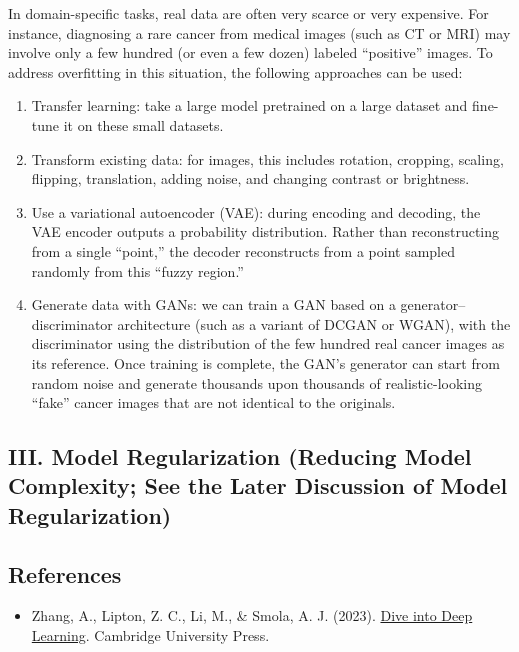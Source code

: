 In domain-specific tasks, real data are often very scarce or very expensive. For instance, diagnosing a rare cancer from medical images (such as CT or MRI) may involve only a few hundred (or even a few dozen) labeled ``positive'' images. To address overfitting in this situation, the following approaches can be used:

\begin{enumerate}
\def\labelenumi{\arabic{enumi}.}
\item
  Transfer learning: take a large model pretrained on a large dataset and fine-tune it on these small datasets.
\item
  Transform existing data: for images, this includes rotation, cropping, scaling, flipping, translation, adding noise, and changing contrast or brightness.
\item
  Use a variational autoencoder (VAE): during encoding and decoding, the VAE encoder outputs a probability distribution. Rather than reconstructing from a single ``point,'' the decoder reconstructs from a point sampled randomly from this ``fuzzy region.''
\item
  Generate data with GANs: we can train a GAN based on a generator--discriminator architecture (such as a variant of DCGAN or WGAN), with the discriminator using the distribution of the few hundred real cancer images as its reference. Once training is complete, the GAN's generator can start from random noise and generate thousands upon thousands of realistic-looking ``fake'' cancer images that are not identical to the originals.
\end{enumerate}

\hypertarget{iii.-model-regularization-reducing-model-complexity-see-the-later-discussion-of-model-regularization}{%
\subsection{III. Model Regularization (Reducing Model Complexity; See the Later Discussion of Model Regularization)}\label{iii.-model-regularization-reducing-model-complexity-see-the-later-discussion-of-model-regularization}}

\FloatBarrier
{}
\hypertarget{references-3}{%
\subsection{References}\label{references-3}}

\vspace{0.25em}
\begin{itemize}
\tightlist
\item
  Zhang, A., Lipton, Z. C., Li, M., \& Smola, A. J. (2023). \href{https://D2L.ai}{Dive into Deep Learning}. Cambridge University Press.
\end{itemize}

\clearpage
